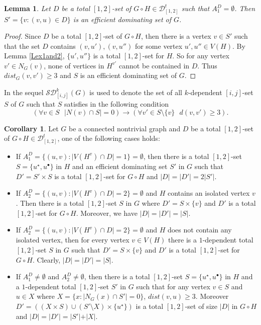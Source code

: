 \documentclass[A4,12pt]{article}
\newtheorem{lemma}[theorem]{Lemma}
\theoremstyle{definition}
\newtheorem{corollary}[theorem]{Corollary}
\theoremstyle{remark}
\begin{document}
\begin{lemma}\label{Lex2a}
Let $D$ be a total $[1,2]$-set of $G \circ H\in \mathcal{D}^t_{[1,2]}$ such that $A_1^D=\emptyset$. Then $S'=\{v: (v,u) \in D\}$ is an efficient dominating set of $G$.
\end{lemma}

\begin{proof}
Since $D$ be a total $[1,2]$-set of $G \circ H$, then there is a vertex $v\in S'$ such that the set $D$ contains $(v,u'),(v,u'')$ for some vertex $u',u''\in V(H)$. By  Lemma \ref{Lex1and2}, $\{u',u''\}$ is a total $[1,2]$-set for $H$. So for any vertex $v'\in N_G(v)$, none of vertices in $H^{v'}$ cannot be contained in $D$. Thus  $dist_G(v,v')\geq 3$ and $S$ is an efficient dominating set of $G$.

\end{proof}
In the sequel  $\mathcal{SD}_{[i,j]}^{k}(G)$ is  used to denote the  set of all $k$-dependent $[i,j]$-set $S$ of $G$ such that $S$ satisfies in the following condition
$$(\forall v\in S \,\,\,\, |N(v)\cap S|=0)\rightarrow (\forall v'\in S\setminus\{v\}\,\,\,\,  d(v,v')\geq3).$$
\begin{corollary}\label{Lex2}
Let $G $ be a connected nontrivial graph and $D$ be a total $[1,2]$-set of $G \circ H\in \mathcal{D}^t_{[1,2]}$, one of the following cases holds:
\begin{itemize}
\item
If $A_1^D=\{(u,v):\vert V(H^v)\cap D\vert=1\}=\emptyset$, then there is a total $[1,2]$-set $S=\{ u^{\star},u^{\bullet}\}$  in $H$ and an efficient dominating set $S'$ in $G$ such that $D'=S' \times S$ is a total $[1,2]$-set for $G \circ H$ and $\vert D\vert = \vert D' \vert = 2\vert S'\vert$.
\item
If $A_2^D=\{(u,v):\vert V(H^v)\cap D\vert=2\}=\emptyset$ and $H$ contains an isolated vertex $v$. Then there is a total $[1,2]$-set $S$ in $G$ where $D'=S \times \{v\}$ and $D'$  is a total $[1,2]$-set for $G \circ H$.  Moreover, we have $\vert D\vert = \vert D' \vert = \vert S\vert$.
\item
If $A_2^D=\{(u,v):\vert V(H^v)\cap D\vert=2\}=\emptyset$ and $H$ does not contain any isolated vertex, then for every vertex $v\in V(H)$  there is a $1$-dependent total $[1,2]$-set $S$ in $G$ such that $D'=S \times \{v\}$ and $D'$  is a total $[1,2]$-set for $G \circ H$.  Clearly, $\vert D\vert = \vert D' \vert = \vert S\vert$.
\item
If $A_1^D \neq \emptyset$ and $A_2^D \neq \emptyset$, then there is a total $[1,2]$-set $S=\{ u^{\star},u^{\bullet}\}$  in $H$ and  a $1$-dependent total $[1,2]$-set $S'$ in $G$ such that  for any vertex $v\in S$ and $u\in X$ where $X=\{x:\vert N_G(x) \cap S' \vert =0\}$, $dist(v,u)\geq 3$. Moreover $D'=((X \times  S)\cup (S'\setminus X)\times \{u^{\star}\})$ is a total $[1,2]$-set of size $\vert D\vert$  in $G \circ H$ and $\vert D\vert = \vert D' \vert = \vert S'\vert+ \vert X\vert$.
\end{itemize}
\end{corollary}
\end{document}
